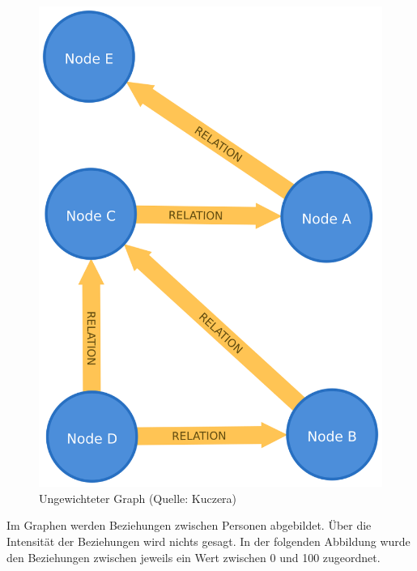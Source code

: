 \documentclass[ngerman,]{scrreprt}
\begin{document}
\begin{figure}
\centering
\includegraphics{Bilder/unWeightedGraph.png}
\caption{Ungewichteter Graph (Quelle: Kuczera)}
\end{figure}

Im Graphen werden Beziehungen zwischen Personen abgebildet. Über die Intensität der Beziehungen wird nichts gesagt. In der folgenden Abbildung wurde den Beziehungen zwischen jeweils ein Wert zwischen 0 und 100 zugeordnet.
\end{document}
